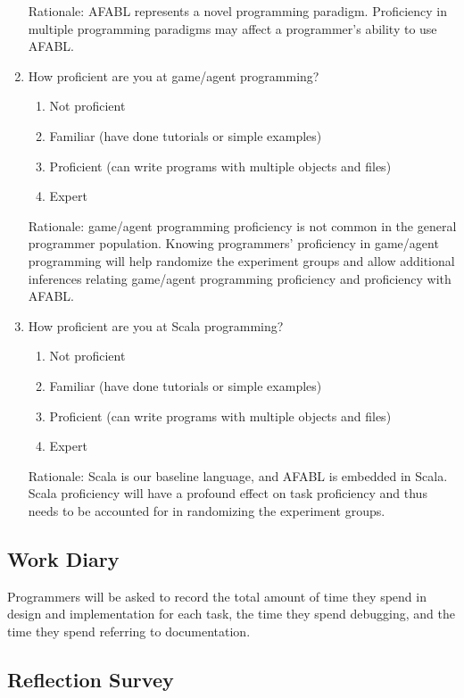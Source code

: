 \begin{enumerate}
Rationale: AFABL represents a novel programming paradigm.  Proficiency in multiple programming paradigms may affect a programmer’s ability to use AFABL.

\item How proficient are you at game/agent programming?  
\begin{enumerate}
\item Not proficient
\item Familiar (have done tutorials or simple examples)
\item Proficient (can write programs with multiple objects and files)
\item Expert
\end{enumerate}

Rationale: game/agent programming proficiency is not common in the general programmer population.  Knowing programmers’ proficiency in game/agent programming will help randomize the experiment groups and allow additional inferences relating game/agent programming proficiency and proficiency with AFABL.

\item How proficient are you at Scala programming?  
\begin{enumerate}
\item Not proficient
\item Familiar (have done tutorials or simple examples)
\item Proficient (can write programs with multiple objects and files)
\item Expert
\end{enumerate}

Rationale: Scala is our baseline language, and AFABL is embedded in Scala.  Scala proficiency will have a profound effect on task proficiency and thus needs to be accounted for in randomizing the experiment groups.

\end{enumerate}

\subsection{Work Diary}

Programmers will be asked to record the total amount of time they spend in design and implementation for each task, the time they spend debugging, and the time they spend referring to documentation.

\subsection{Reflection Survey}

